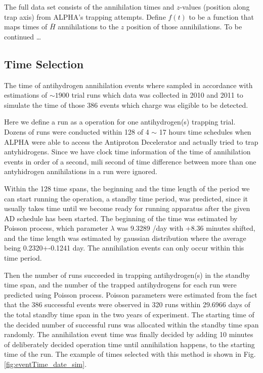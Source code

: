 \documentclass[superscriptaddress,aps,prb,11pt]{revtex4-1}
\begin{document}
The full data set consists of the annihilation times and $z$-values (position along trap axis) from ALPHA's trapping attempts.  Define $f(t)$ to be a function that maps times of $\bar{H}$ annihilations to the $z$ position of those annihilations.  To be continued \ldots

\subsection*{Time Selection}
 The time of antihydrogen annihilation events where sampled in accordance with estimations of $\sim 1900$  trial runs which data was collected in 2010 and 2011 to simulate the time of those 386 events which charge was eligible to be detected.
 
 Here we define a run as a operation for one antihydrogen(s) trapping trial. Dozens of runs were conducted within 128 of 4 $\sim$ 17 hours time schedules when ALPHA were able to access the Antiproton Decelerator and actually tried to trap antyhidrogens. Since we have clock time information of the time of annihilation events in order of a second, mili second of time difference between more than one antyhidrogen annihilations  in a run were ignored.
 
 Within the 128 time spans, the beginning and the time length of the period we can start running the operation, a standby time period, was predicted, since it usually takes time until we become ready for running apparatus after the given AD schedule has been started. The beginning of the time was estimated by Poisson process, which parameter $\lambda$ was 9.3289 /day  with +8.36 minutes shifted, and the time length was estimated by gaussian distribution where the average being 0.2320+-0.1241 day. The annihilation events can only occur within this time period. 
 
 Then the number of runs succeeded in trapping antihydrogen(s) in the standby time span, and the number of the trapped antihydrogens for each run were predicted using Poisson process. Poisson parameters were estimated from the fact that the 386 successful events were observed in 320 runs within 29.6966 days of the total standby time span in the two years of experiment. 
The starting time of the decided number of  successful runs was allocated within the standby time span randomly. The annihilation event time was finally decided by adding 10 minutes of deliberately decided operation time until annihilation happens, to the starting time of the run. The example of times selected with this method is shown in Fig.\ref{fig:eventTime_date_sim}.
 
\end{document}
